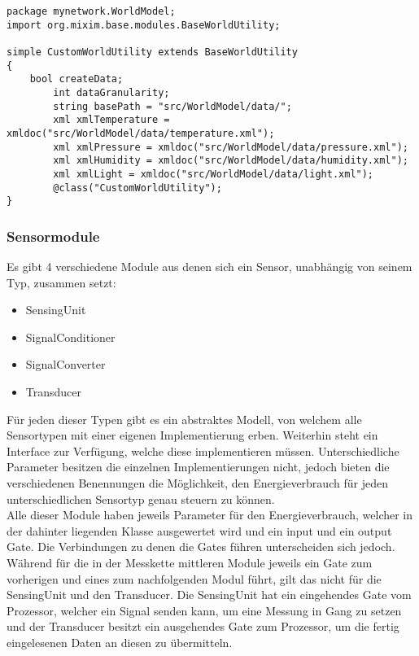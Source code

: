 \begin{minipage}{\textwidth}
\begin{lstlisting}[language=ned,caption={CustomWorldUtility},label=lst:CustomWorldUtility]
package mynetwork.WorldModel;
import org.mixim.base.modules.BaseWorldUtility;

simple CustomWorldUtility extends BaseWorldUtility
{
    bool createData;
        int dataGranularity;
        string basePath = "src/WorldModel/data/";
        xml xmlTemperature = xmldoc("src/WorldModel/data/temperature.xml");
        xml xmlPressure = xmldoc("src/WorldModel/data/pressure.xml");
        xml xmlHumidity = xmldoc("src/WorldModel/data/humidity.xml");
        xml xmlLight = xmldoc("src/WorldModel/data/light.xml");
        @class("CustomWorldUtility");
}
\end{lstlisting}
\end{minipage}

\subsubsection{Sensormodule}

Es gibt 4 verschiedene Module aus denen sich ein Sensor, unabhängig von seinem Typ, zusammen setzt:

\begin{itemize}
\item SensingUnit
\item SignalConditioner
\item SignalConverter
\item Transducer
\end{itemize}

Für jeden dieser Typen gibt es ein abstraktes Modell, von welchem alle Sensortypen mit einer eigenen Implementierung erben. Weiterhin steht ein Interface zur Verfügung, welche diese implementieren müssen. Unterschiedliche Parameter besitzen die einzelnen Implementierungen nicht, jedoch bieten die verschiedenen Benennungen die Möglichkeit, den Energieverbrauch für jeden unterschiedlichen Sensortyp genau steuern zu können.\\
Alle dieser Module haben jeweils Parameter für den Energieverbrauch, welcher in der dahinter liegenden Klasse ausgewertet wird und ein input und ein output Gate. Die Verbindungen zu denen die Gates führen unterscheiden sich jedoch.\\
Während für die in der Messkette mittleren Module jeweils ein Gate zum vorherigen und eines zum nachfolgenden Modul führt, gilt das nicht für die SensingUnit und den Transducer. Die SensingUnit hat ein eingehendes Gate vom Prozessor, welcher ein Signal senden kann, um eine Messung in Gang zu setzen und der Transducer besitzt ein ausgehendes Gate zum Prozessor, um die fertig eingelesenen Daten an diesen zu übermitteln.

